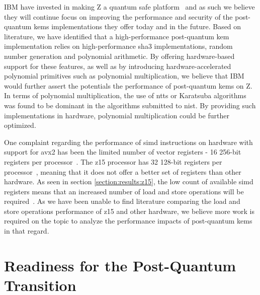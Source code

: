 IBM have invested in making Z a quantum safe platform~\cite{ibm:z15:2019} and as such we believe they will continue focus on improving the performance and security of the \gls{post-quantum} \glspl{kem} implementations they offer today and in the future. Based on literature, we have identified that a high-performance \gls{post-quantum} \gls{kem} implementation relies on high-performance \gls{sha3} implementations, random number generation and polynomial arithmetic. By offering hardware-based support for these features, as well as by introducing hardware-accelerated polynomial primitives such as polynomial multiplication, we believe that IBM would further assert the potentials the performance of \gls{post-quantum} \glspl{kem} on Z. In terms of polynomial multiplication, the use of \glspl{ntt} or Karatsuba algorithms was found to be dominant in the algorithms submitted to \gls{nist}. By providing such implementations in hardware, polynomial multiplication could be further optimized.

One complaint regarding the performance of \gls{simd} instructions on hardware with support for \gls{avx2} has been the limited number of vector registers - 16 256-bit registers per processor~\cite{guneysu2013}. The \gls{z15} processor has 32 128-bit registers per processor~\cite{redbook:z15}, meaning that it does not offer a better set of registers than other hardware. As seen in section \ref{section:results:z15}, the low count of available \gls{simd} registers means that an increased number of load and store operations will be required~\cite{guneysu2013}. As we have been unable to find literature comparing the load and store operations performance of \gls{z15} and other hardware, we believe more work is required on the topic to analyze the performance impacts of \gls{post-quantum} \glspl{kem} in that regard.


\section{Readiness for the Post-Quantum Transition}

